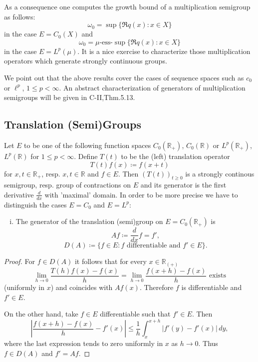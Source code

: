 \newpage

As a consequence one computes the growth bound of a multiplication semigroup as follows:
\[
    \omega_{0} = \sup\{\Re q(x) : x \in X\} 
\]
in the case $E = C_{0}(X)$ and 
\[
    \omega_{0} = \mu\text{-ess-}\sup\{\Re q(x) : x \in X\} 
\]
in the case  $E = L^{p}(\mu)$.
It is a nice exercise to characterize those multiplication operators which generate strongly continuous groups.

We point out that the above results cover the cases of sequence spaces such as $c_{0}$ or $\ell^{p}$, $1 \leq p < \infty$.
An abstract characterization of generators of multiplication semigroups will be given in C-II,Thm.5.13.

\subsection{Translation (Semi)Groups}\label{subsec:a1-2.4}

Let $E$ to be one of the following function spaces $C_{0}(\mathbb{R}_{+})$, $C_{0}(\mathbb{R})$ or $L^{p}(\mathbb{R}_{+})$, $L^{p}(\mathbb{R})$ for $1 \leq p < \infty$.
Define $T(t)$ to be the (left) translation operator
\[
    T(t)f(x) \coloneqq f(x+t)
\]
for $x, t \in \mathbb{R}_{+}$, resp. $x, t \in \mathbb{R}$ and $f \in E$.
Then $(T(t))_{t \geq 0}$ is a strongly continous semigroup, resp. group of contractions on $E$ and its generator is the first derivative $\frac{d}{dx}$ with 'maximal' domain.
In order to be more precise we have to distinguish the cases $E = C_{0}$ and $E = L^{p}$:
\begin{enumerate}[(i)]
\item The generator of the translation (semi)group on $E = C_{0}(\mathbb{R}_{+})$ is 
    \[
    Af \coloneqq \frac{d}{dx}f = f',
    \]
    \[
    D(A) \coloneqq \{f \in E : f \text{ differentiable and } f' \in E\}.
    \]
\end{enumerate}
\begin{proof}
For $f \in D(A)$ it follows that for every $x \in \mathbb{R}_{(+)}$
\[
    \lim_{h \to 0} \frac{T(h)f(x) - f(x)}{h} = \lim_{h \to 0} \frac{f(x+h) - f(x)}{h} \text{ exists}
\]
(uniformly in $x$) and coincides with $Af(x)$.
Therefore $f$ is differentiable and $f' \in E$.

On the other hand, take $f \in E$ differentiable such that $f' \in E$.
Then
\[
    \left|\frac{f(x+h) - f(x)}{h} - f'(x)\right| \leq \frac{1}{h}\int_{x}^{x+h}|f'(y) - f'(x)|\,dy,
\]
where the last expression tends to zero uniformly in $x$ as $h \to 0$.
Thus $f \in D(A)$ and $f' = Af$.
\end{proof}

